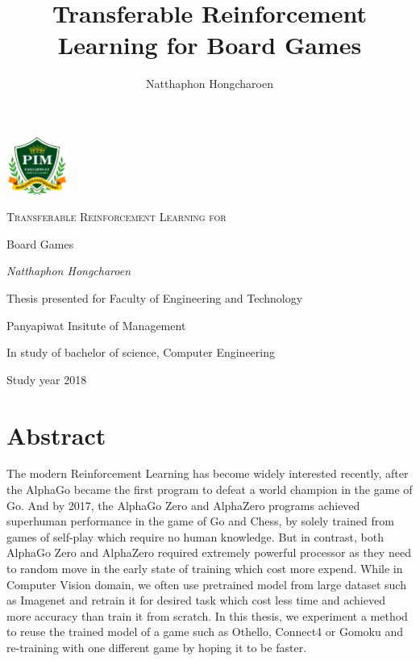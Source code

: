 \documentclass[12pt,a4paper]{article}
\title{Transferable Reinforcement Learning for Board Games}
\author{Natthaphon Hongcharoen}
\begin{document}

\begin{titlepage}
	\centering
	\includegraphics[width=0.15\textwidth]{logo.png}\par\vspace{1cm}
	{\scshape\Huge Transferable Reinforcement Learning for \par Board Games\par}
	\vfill
	{\Large\itshape Natthaphon Hongcharoen\par}
	\vfill
	{\Large  \par}
	{\large Thesis presented for Faculty of Engineering and Technology \par\vspace{0.1cm}}
	{\large Panyapiwat Insitute of Management\par\vspace{0.1cm}}
	{\large In study of bachelor of science, Computer Engineering
	}


	{\large Study year 2018 \par}
\end{titlepage}

\clearpage %
\pagestyle{empty}  %

\section*{Abstract}
\tab\hspace{0.3cm}The modern Reinforcement Learning has become widely interested recently, after the AlphaGo\cite{AlphaGo} became the first program to defeat a world champion in the game of Go. And by 2017, the AlphaGo Zero\cite{AlphaGoZero} and AlphaZero\cite{AlphaZero} programs achieved superhuman performance in the game of Go and Chess, by solely trained from games of self-play which require no human knowledge. But in contrast, both AlphaGo Zero and AlphaZero required extremely powerful processor as they need to random move in the early state of training which cost more expend. While in Computer Vision domain, we often use pretrained model from large dataset such as Imagenet\cite{Imagenet} and retrain it for desired task which cost less time and achieved more accuracy than train it from scratch. In this thesis, we experiment a method to reuse the trained model of a game such as Othello, Connect4 or Gomoku and re-training with one different game by hoping it to be faster.
\clearpage
\end{document}
